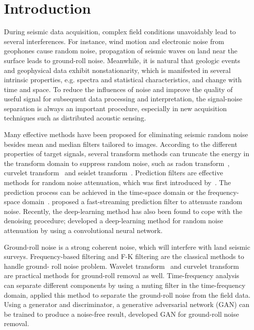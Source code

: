 \section{Introduction}
During seismic data acquisition, complex field conditions unavoidably lead to several
interferences. For instance, wind motion and electronic noise from geophones cause random
noise, propagation of seismic waves on land near the surface leads to ground-roll noise.
Meanwhile, it is natural that geologic events and geophysical data exhibit nonstationarity,
which is manifested in several intrinsic properties, e.g. spectra and statistical
characteristics, and change with time and space. To reduce the influences of noise and
improve the quality of useful signal for subsequent data processing and interpretation,
the signal-noise separation is always an important procedure, especially in new
acquisition techniques such as distributed acoustic sensing.

Many effective methods have been proposed for eliminating seismic random noise besides
mean and median filters tailored to images. According to the different properties of
target signals, several transform methods can truncate the energy in the transform
domain to suppress random noise, such as radon transform~\cite[]{Claerbout71,Trad02},
curvelet transform~\cite[]{Kumar09} and seislet transform~\cite[]{Fomel10,Liu15}.
Prediction filters are effective methods for random noise attenuation, which was first
introduced by~\cite{Canales84}. The prediction process can be achieved in the time-space
domain or the frequency-space domain~\cite[]{Wang99}. \cite{Liu18} proposed a fast-streaming
prediction filter to attenuate random noise. Recently, the deep-learning method has
also been found to cope with the denoising procedure; \cite{Yu19} developed a deep-learning
method for random noise attenuation by using a convolutional neural network.

Ground-roll noise is a strong coherent noise, which will interfere with land seismic
surveys. Frequency-based filtering and F-K filtering are the classical methods to
handle ground- roll noise problem. Wavelet transform~\cite[]{Miao98,Corso03}
and curvelet transform~\cite[]{Naghizadeh18} are practical methods for ground-roll
removal as well. Time-frequency analysis can separate different components by using
a muting filter in the time-frequency domain, \cite{Liu13} applied this method to
separate the ground-roll noise from the field data. Using a generator and discriminator,
a generative adversarial network (GAN) can be trained to produce a noise-free result,
\cite{Yuan20} developed GAN for ground-roll noise removal.

